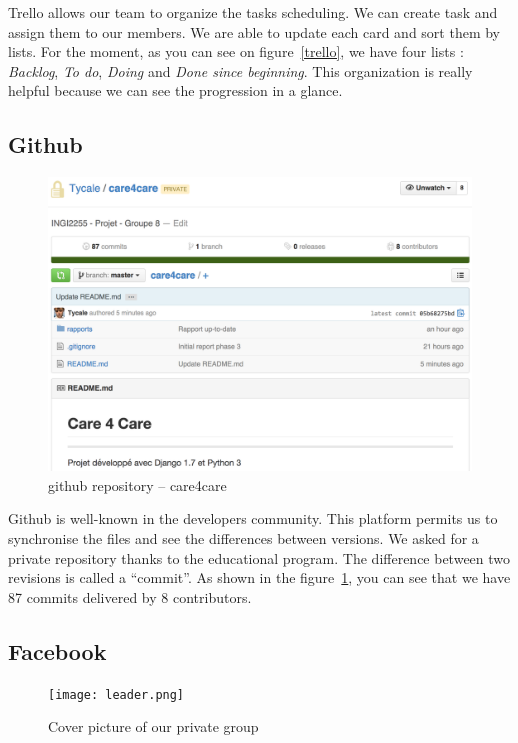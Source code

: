 \documentclass[11pt, a4paper]{article}   	%
\newcommand{\tit}[1]{\textit{#1}}
\begin{document}
Trello allows our team to organize the tasks scheduling.
We can create task and assign them to our members.
We are able to update each card and sort them by lists.
For the moment, as you can see on figure~\ref{trello}, we have four lists : \tit{Backlog}, \tit{To do}, \tit{Doing} and \tit{Done since beginning}.
This organization is really helpful because we can see the progression in a glance.

\subsection{Github}

\begin{figure}[!ht]
   \includegraphics[width=\textwidth]{github.png}
   \caption{\label{github} github repository – care4care}
\end{figure}

Github is well-known in the developers community.
This platform permits us to synchronise the files and see the differences between versions.
We asked for a private repository thanks to the educational program.
The difference between two revisions is called a \enquote{commit}.
As shown in the figure~\ref{github}, you can see that we have 87 commits delivered by 8 contributors.

\subsection{Facebook}

\begin{figure}[!ht]
   \texttt{[image: leader.png]}
   \caption{\label{facebook} Cover picture of our private group}
\end{figure}
\end{document}
